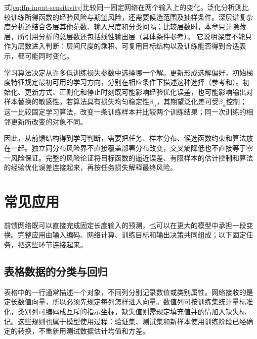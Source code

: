 式\eqref{eq:ffn-input-sensitivity}比较同一固定网络在两个输入上的变化。泛化分析则比较训练所得函数的经验风险与期望风险，还需要候选范围及抽样条件。深层谱复杂度分析还结合各层其他范数、输入尺度和分类间隔；比较层数时，本章只计隐藏层，所引用分析的总层数还包括线性输出层（具体条件参考）。
它说明深度不能只作为层数进入判断：层间尺度的乘积、可复用目标结构以及训练能否得到合适表示，都可能同时变化。

学习算法决定从许多低训练损失参数中选择哪一个解。更新形成选解偏好，初始梯度特征规定最初可用的学习方向，分别在相应条件下描述这种选择（参考和）。初始化、更新方式、正则化和停止时刻既可能影响经验优化误差，也可能影响输出对样本替换的敏感性。若算法具有损失均匀稳定性$\beta_n$，其期望泛化差可受$\beta_n$控制；这一比较固定学习算法，改变一条训练样本并比较两个训练结果；同一次训练的相邻更新所改变的对象不同。

因此，从前馈结构得到学习判断，需要把任务、样本分布、候选函数约束和算法放在一起。独立同分布风险界不直接覆盖部署分布改变，交叉熵降低也不直接等于零一风险保证。完整的风险论证将目标函数的逼近误差、有限样本的估计控制和算法的经验优化误差连接起来，再按任务损失解释最终风险。

\section{常见应用}
\label{sec:ffn-applications}

前馈网络既可以直接完成固定长度输入的预测，也可以在更大的模型中承担一段变换。完整应用由输入编码、网络计算、训练目标和输出决策共同组成；以下固定任务，把这些环节连接起来。

\subsection{表格数据的分类与回归}
\label{sec:ffn-tabular}

表格中的一行通常描述一个对象，不同列分别记录数值或类别属性。网络接收的是定长数值向量，所以必须先规定每列怎样进入向量。数值列可按训练集统计量标准化，类别列可编码成互斥的指示坐标，缺失值则需规定填充值并酌情加入缺失标记。这些规则也属于模型使用过程：验证集、测试集和新样本使用训练阶段已经确定的转换，不重新用测试数据估计均值和方差。

